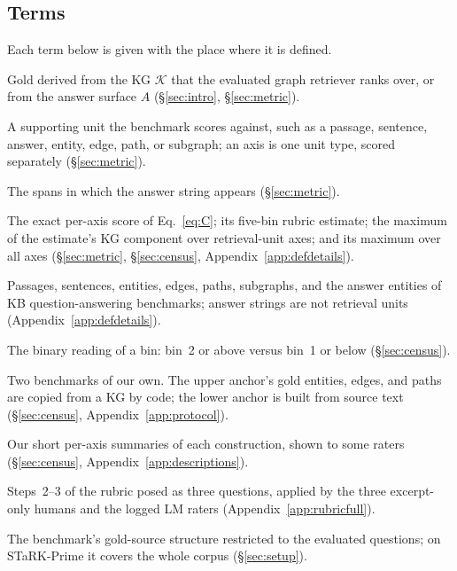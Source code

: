 \documentclass[11pt]{article}
\newcommand{\C}{\mathrm{C}}
\newcommand{\Chat}{\widehat{\mathrm{C}}}
\newcommand{\kg}{\mathcal{K}}
\begin{document}
\subsection{Terms}
\label{app:terms}
Each term below is given with the place where it is defined.
{\footnotesize
\begin{description}\setlength{\itemsep}{1pt}\setlength{\parskip}{0pt}
\item[Provenance circularity.] Gold derived from the KG $\kg$ that the evaluated graph retriever ranks over, or from the answer surface $A$ (\S\ref{sec:intro}, \S\ref{sec:metric}).
\item[Gold unit, gold-unit axis.] A supporting unit the benchmark scores against, such as a passage, sentence, answer, entity, edge, path, or subgraph; an axis is one unit type, scored separately (\S\ref{sec:metric}).
\item[Answer surface $A$.] The spans in which the answer string appears (\S\ref{sec:metric}).
\item[$\C_a$, $\Chat_a$, $\Chat_{\kg}$, $\Chat$.] The exact per-axis score of Eq.~\eqref{eq:C}; its five-bin rubric estimate; the maximum of the estimate's KG component over retrieval-unit axes; and its maximum over all axes (\S\ref{sec:metric}, \S\ref{sec:census}, Appendix~\ref{app:defdetails}).
\item[Retrieval-unit axes.] Passages, sentences, entities, edges, paths, subgraphs, and the answer entities of KB question-answering benchmarks; answer strings are not retrieval units (Appendix~\ref{app:defdetails}).
\item[Derived versus independent.] The binary reading of a bin: bin~2 or above versus bin~1 or below (\S\ref{sec:census}).
\item[Calibration anchors.] Two benchmarks of our own. The upper anchor's gold entities, edges, and paths are copied from a KG by code; the lower anchor is built from source text (\S\ref{sec:census}, Appendix~\ref{app:protocol}).
\item[Condensed descriptions.] Our short per-axis summaries of each construction, shown to some raters (\S\ref{sec:census}, Appendix~\ref{app:descriptions}).
\item[Step procedure.] Steps~2--3 of the rubric posed as three questions, applied by the three excerpt-only humans and the logged LM raters (Appendix~\ref{app:rubricfull}).
\item[Aligned KG.] The benchmark's gold-source structure restricted to the evaluated questions; on STaRK-Prime it covers the whole corpus (\S\ref{sec:setup}).

\end{description}}
\end{document}
